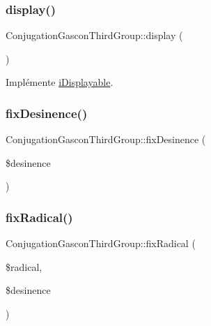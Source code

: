 \subsubsection{\texorpdfstring{display()}{display()}}
{\footnotesize\ttfamily Conjugation\+Gascon\+Third\+Group\+::display (\begin{DoxyParamCaption}{ }\end{DoxyParamCaption})}



Implémente \hyperlink{interfacei_displayable_a0264fd455c876e897f754cf85f1681ca}{i\+Displayable}.

\hypertarget{class_conjugation_gascon_third_group_a59ac06a6aa3030d98069f534ddea8398}{}\label{class_conjugation_gascon_third_group_a59ac06a6aa3030d98069f534ddea8398} 
\subsubsection{\texorpdfstring{fix\+Desinence()}{fixDesinence()}}
{\footnotesize\ttfamily Conjugation\+Gascon\+Third\+Group\+::fix\+Desinence (\begin{DoxyParamCaption}\item[{}]{\$desinence }\end{DoxyParamCaption})\hspace{0.3cm}{\ttfamily [protected]}}

\hypertarget{class_conjugation_gascon_third_group_a85f7883338561152e0493cf7902cfc75}{}\label{class_conjugation_gascon_third_group_a85f7883338561152e0493cf7902cfc75} 
\subsubsection{\texorpdfstring{fix\+Radical()}{fixRadical()}}
{\footnotesize\ttfamily Conjugation\+Gascon\+Third\+Group\+::fix\+Radical (\begin{DoxyParamCaption}\item[{}]{\$radical,  }\item[{}]{\$desinence }\end{DoxyParamCaption})\hspace{0.3cm}{\ttfamily [protected]}}

